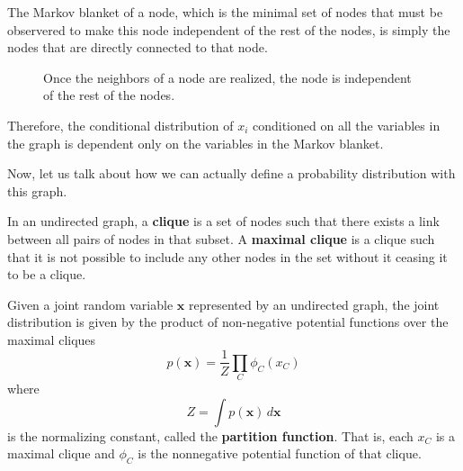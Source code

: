 \documentclass{article}
\begin{document}
  \begin{definition}
    The Markov blanket of a node, which is the minimal set of nodes that must be observered to make this node independent of the rest of the nodes, is simply the nodes that are directly connected to that node. 

    \begin{figure}[H]
      \centering 
      \caption{Once the neighbors of a node are realized, the node is independent of the rest of the nodes. } 
      \label{fig:markov_blanket_undirected}
    \end{figure}

    Therefore, the conditional distribution of $x_i$ conditioned on all the variables in the graph is dependent only on the variables in the Markov blanket. 
  \end{definition}

  Now, let us talk about how we can actually define a probability distribution with this graph. 

  \begin{definition}[Clique] 
    In an undirected graph, a \textbf{clique} is a set of nodes such that there exists a link between all pairs of nodes in that subset. A \textbf{maximal clique} is a clique such that it is not possible to include any other nodes in the set without it ceasing it to be a clique. 
  \end{definition}

  Given a joint random variable $\mathbf{x}$  represented by an undirected graph, the joint distribution is given by the product of non-negative potential functions over the maximal cliques 
  \begin{equation}
    p(\mathbf{x}) = \frac{1}{Z} \prod_C \phi_C (x_C)
  \end{equation}
  where 
  \begin{equation}
    Z = \int p(\mathbf{x}) \,d\mathbf{x}
  \end{equation}
  is the normalizing constant, called the \textbf{partition function}. That is, each $x_C$ is a maximal clique and $\phi_C$ is the nonnegative potential function of that clique. 
\end{document}
